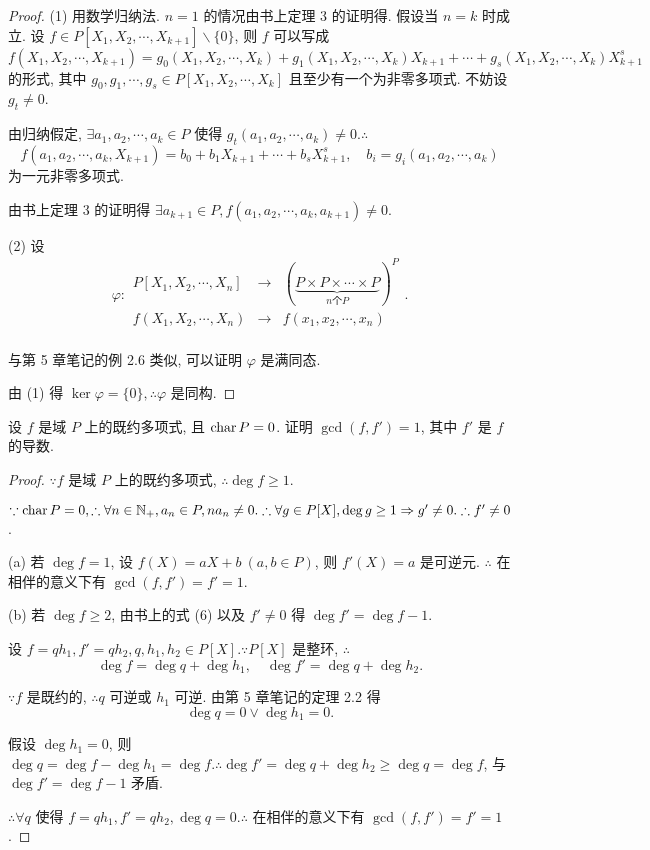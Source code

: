 \documentclass[color=black,device=normal,lang=cn,mode=geye]{elegantnote}
\begin{document}
\begin{proof}
    (1) 用数学归纳法. $n=1$ 的情况由书上定理 3 的证明得. 假设当 $n=k$ 时成立. 设 $f\in P[X_1,X_2,\cdots,X_{k+1}]\backslash\{0\}$, 则 $f$ 可以写成
    \[f(X_1,X_2,\cdots,X_{k+1})=g_0(X_1,X_2,\cdots,X_k)+g_1(X_1,X_2,\cdots,X_k)X_{k+1}+\cdots+g_s(X_1,X_2,\cdots,X_k)X^s_{k+1}\]
    的形式, 其中 $g_0,g_1,\cdots,g_s\in P[X_1,X_2,\cdots,X_k]$ 且至少有一个为非零多项式. 不妨设 $g_t\neq0$.

    由归纳假定, $\exists a_1,a_2,\cdots,a_k\in P$ 使得 $g_t(a_1,a_2,\cdots,a_k)\neq0.\therefore$
    \[f(a_1,a_2,\cdots,a_k,X_{k+1})=b_0+b_1X_{k+1}+\cdots+b_sX^s_{k+1},\quad b_i=g_i(a_1,a_2,\cdots,a_k)\]
    为一元非零多项式.

    由书上定理 3 的证明得 $\exists a_{k+1}\in P,f(a_1,a_2,\cdots,a_k,a_{k+1})\neq0$.

    (2) 设
    \[\varphi:\begin{array}{rcl}
        P[X_1,X_2,\cdots,X_n] & \to & (\underbrace{P\times P\times\cdots\times P}_{n\text{个}P})^P \\
        f(X_1,X_2,\cdots,X_n) & \to & f(x_1,x_2,\cdots,x_n) \\
    \end{array}.\]

    与第 5 章笔记的例 2.6 类似, 可以证明 $\varphi$ 是满同态.

    由 (1) 得 $\ker\varphi=\{0\},\therefore\varphi$ 是同构.
\end{proof}
\addtocounter{exercise}{3}
\begin{exercise}\label{ex1.6}
    设 $f$ 是域 $P$ 上的既约多项式, 且 $\operatorname{char} P=0$. 证明 $\gcd(f,f')=1$, 其中 $f'$ 是 $f$ 的导数.
\end{exercise}
\begin{proof}
    $\because f$ 是域 $P$ 上的既约多项式, $\therefore\deg f\geq1$.

    $\because\operatorname{char} P=0,\therefore\forall n\in\mathbb{N}_+,a_n\in P,na_n\neq0.\therefore\forall g\in P[X],\deg g\geq1\Rightarrow g'\neq0.\therefore f'\neq0$.

    (a) 若 $\deg f=1$, 设 $f(X)=aX+b\ (a,b\in P)$, 则 $f'(X)=a$ 是可逆元. $\therefore$ 在相伴的意义下有 $\gcd(f,f')=f'=1$.

    (b) 若 $\deg f\geq2$, 由书上的式 (6) 以及 $f'\neq0$ 得 $\deg f'=\deg f-1$.
    
    设 $f=qh_1,f'=qh_2,q,h_1,h_2\in P[X].\because P[X]$ 是整环, $\therefore$
    \[\deg f=\deg q+\deg h_1,\quad\deg f'=\deg q+\deg h_2.\]

    $\because f$ 是既约的, $\therefore q$ 可逆或 $h_1$ 可逆. 由第 5 章笔记的定理 2.2 得
    \[\deg q=0\vee\deg h_1=0.\]

    假设 $\deg h_1=0$, 则 $\deg q=\deg f-\deg h_1=\deg f.\therefore\deg f'=\deg q+\deg h_2\geq\deg q=\deg f$, 与 $\deg f'=\deg f-1$ 矛盾.

    $\therefore\forall q$ 使得 $f=qh_1,f'=qh_2,\deg q=0.\therefore$ 在相伴的意义下有 $\gcd(f,f')=f'=1$.
\end{proof}
\end{document}

